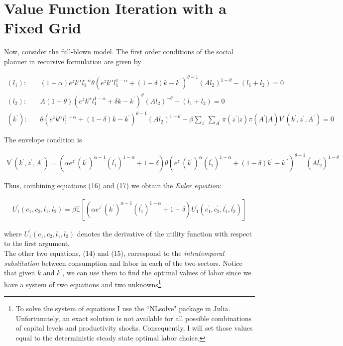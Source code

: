 \documentclass[11pt,a4paper]{article}
\begin{document}
\section{Value Function Iteration with a Fixed Grid}
Now, consider the full-blown model. The first order conditions of the social planner in recursive formulation are given by
\begin{small}
\begin{align}
(l_1): \quad  & (1-\alpha)e^z k^{\alpha} l_{1}^{-\alpha} \theta \left(e^z k^{\alpha}l_{1}^{1-\alpha} + (1-\delta) k - k^{\prime}\right)^{\theta-1} \left(A l_{2}\right)^{1-\theta} - \left(l_{1} + l_{2}\right) = 0
\\
(l_2): \quad & A (1-\theta) \left(e^z k^{\alpha}l_{1}^{1-\alpha} + \delta k - k^{\prime}\right)^{\theta} (Al_{2})^{-\theta} - \left(l_{1} + l_{2}\right) = 0 \\
(k^{\prime}): \quad & \theta \left(e^{z} k^{\alpha} l_{1}^{1-\alpha} + (1-\delta) k - k^{\prime}\right)^{\theta-1} (Al_{2})^{1-\theta} - \beta \sum_{z^{\prime}}\sum_{A^{\prime}} \pi\left(z^{\prime}|z\right) \pi\left(A^{\prime}|A\right) V^{\prime}\left(k^{\prime},z^{\prime},A^{\prime}\right) = 0
\end{align}
\end{small}
The envelope condition is
\begin{small}
\begin{align}
\mathbb{V}^{\prime}\left(k^{\prime},z^{\prime},A^{\prime}\right) =\left(\alpha e^{z^{\prime}} (k^{\prime})^{\alpha-1}(l_{1}^{\prime})^{1-\alpha} +1 - \delta \right) \theta \left(e^{z^{\prime}} (k^{\prime})^{\alpha} (l_{1}^{\prime})^{1-\alpha} + (1-\delta) k^{\prime} - k^{\prime \prime}\right)^{\theta-1} (Al_{2}^{\prime})^{1-\theta}
\end{align}
\end{small}
Thus, combining equations (16) and (17) we obtain the \textit{Euler equation}:
\begin{small}
\begin{align}
U_1^{\prime}(c_1,c_2,l_1,l_2) = \beta \mathbb{E} \left[ (\alpha e^{z^{\prime}} (k^{\prime})^{\alpha-1}(l_{1}^{\prime})^{1-\alpha} + 1- \delta )  U_1^{\prime}(c_1^{\prime},c_2^{\prime}, l^{\prime}_1,l^{\prime}_2) \right]
\end{align}
\end{small}
\hspace{-0.15cm}where $U_1^{\prime}(c_1,c_2,l_1,l_2)$ denotes the derivative of the utility function with respect to the first argument.
\\
The other two equations, (14) and (15), correspond to the \textit{intratemporal substitution} between consumption and labor in each of the two sectors. Notice that given $k$ and $k^{\prime}$, we can use them to find the optimal values of labor since we have a system of two equations and two unknowns\footnote{ To solve the system of equations I use the ``NLsolve" package in Julia. Unfortunately, an exact solution is not available for all possible combinations of capital levels and productivity shocks. Consequently, I will set those values equal to the deterministic steady state optimal labor choice. }.
\end{document}
